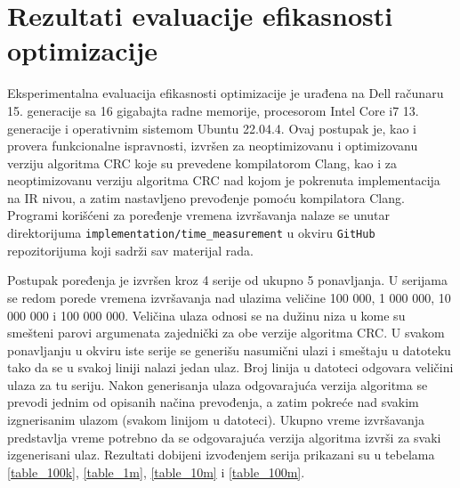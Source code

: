 \documentclass[12pt,oneside]{memoir}
\begin{document}
\section{Rezultati evaluacije efikasnosti optimizacije}


Eksperimentalna evaluacija efikasnosti optimizacije je urađena na Dell računaru 15. generacije sa 16 gigabajta radne memorije, procesorom Intel Core i7 13. generacije i operativnim sistemom Ubuntu 22.04.4. 
Ovaj postupak je, kao i provera funkcionalne ispravnosti, izvršen za neoptimizovanu i optimizovanu verziju algoritma CRC koje su prevedene kompilatorom Clang, kao i za neoptimizovanu verziju algoritma CRC nad kojom je pokrenuta implementacija na IR nivou, a zatim nastavljeno prevođenje pomoću kompilatora Clang. Programi korišćeni za poređenje vremena izvršavanja nalaze se unutar direktorijuma \texttt{implementation/time\_measurement} u okviru \texttt{GitHub} repozitorijuma koji sadrži sav materijal rada. 

Postupak poređenja je izvršen kroz 4 serije od ukupno 5 ponavljanja. U serijama se redom porede vremena izvršavanja nad ulazima veličine 100 000, 1 000 000, 10 000 000 i 100 000 000. Veličina ulaza odnosi se na dužinu niza u kome su smešteni parovi argumenata zajednički za obe verzije algoritma CRC. U svakom ponavljanju u okviru iste serije se generišu nasumični ulazi i smeštaju u datoteku tako da se u svakoj liniji nalazi jedan ulaz. Broj linija u datoteci odgovara veličini ulaza za tu seriju. Nakon generisanja ulaza odgovarajuća verzija algoritma se prevodi jednim od opisanih načina prevođenja, a zatim pokreće nad svakim izgnerisanim ulazom (svakom linijom u datoteci). Ukupno vreme izvršavanja predstavlja vreme potrebno da se odgovarajuća verzija algoritma izvrši za svaki izgenerisani ulaz. Rezultati dobijeni izvođenjem serija prikazani su u tebelama \ref{table_100k}, \ref{table_1m}, \ref{table_10m} i \ref{table_100m}.

\end{document}
